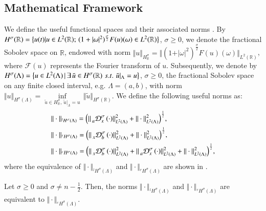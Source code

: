\subsection{Mathematical Framework}
\label{Sec: Sol Test Space FPDE}
%
We define the useful functional spaces and their associated norms \cite{kharazmi2017petrov,Li2009}. By $H^\sigma(\mathbb{R}) = \big{\{} u(t) \vert u \in L^{2}(\mathbb{R});\, (1+\vert \omega \vert^2)^{\frac{\sigma}{2}} F(u)(\omega) \in L^{2}(\mathbb{R}) \big{\}}$, $\sigma \geq 0$, we denote the fractional Sobolev space on $\mathbb{R}$, endowed with norm $\Vert u \Vert_{H^{\sigma}_{\mathbb{R}}}=\Vert (1+\vert \omega \vert^2)^{\frac{\sigma}{2}} F(u)(\omega) \Vert_{L^{2}(\mathbb{R})}$, where $\mathcal{F}(u)$ represents the Fourier transform of $u$. Subsequently, we denote by $H^\sigma(\Lambda) =\big{\{} u\in L^{2}(\Lambda)\, \vert \,\exists \, \tilde{u} \in H^{\sigma}(\mathbb{R})\, \, s.t. \, \,\tilde{u}\vert_{\Lambda}=u \big{\}}$, $\sigma \geq 0$, the fractional Sobolev space on any finite closed interval, e.g. $\Lambda = (a,b)$, with norm $ \Vert u \Vert_{H^{\sigma}(\Lambda)}= \underset{\tilde{u}\in H^{\sigma}_{\mathbb{R}},\, \tilde{u}\vert_{\Lambda}=u }{\inf} \, \Vert \tilde{u} \Vert_{{}H^{\sigma}(\mathbb{R})}$. We define the following useful norms as:
%
\begin{align*}
%
&\Vert \cdot \Vert_{{^l}H^{\sigma}_{}(\Lambda)} = \Big(\Vert \prescript{}{a}{\mathcal{D}}_{x}^{\sigma}\, (\cdot)\Vert_{L^2(\Lambda)}^2+\Vert \cdot \Vert_{L^2(\Lambda)}^2 \Big)^{\frac{1}{2}},
\\
&\Vert \cdot \Vert_{{^r}H^{\sigma}_{}(\Lambda)} = \Big(\Vert \prescript{}{x}{\mathcal{D}}_{b}^{\sigma}\, (\cdot)\Vert_{L^2(\Lambda)}^2+\Vert \cdot \Vert_{L^2(\Lambda)}^2 \Big)^{\frac{1}{2}},
\\
&\Vert \cdot \Vert_{{^c}H^{\sigma}_{}(\Lambda)} = \Big(\Vert \prescript{}{x}{\mathcal{D}}_{b}^{\sigma}\, (\cdot)\Vert_{L^2(\Lambda)}^2+\Vert \prescript{}{a}{\mathcal{D}}_{x}^{\sigma}\, (\cdot)\Vert_{L^2(\Lambda)}^2+\Vert \cdot \Vert_{L^2(\Lambda)}^2 \Big)^{\frac{1}{2}},
%
\end{align*}
%
where the equivalence of $\Vert \cdot \Vert_{{^l}H^{\sigma}_{}(\Lambda)}$ and $\Vert \cdot \Vert_{{^r}H^{\sigma}_{}(\Lambda)}$ are shown in \cite{Li2009,ervin2007variational,Li2010}. 
%
\begin{lem}
	\label{Lem: norm equivalence 1}
	Let $\sigma \geq 0$ and $\sigma \neq n-\frac{1}{2}$. Then, the norms $\Vert \cdot \Vert_{{^l}H^{\sigma}_{}(\Lambda)}$ and $\Vert \cdot \Vert_{{^r}H^{\sigma}_{}(\Lambda)}$ are equivalent to $\Vert \cdot \Vert_{{^c}H^{\sigma}_{}(\Lambda)}$.
\end{lem}
%


